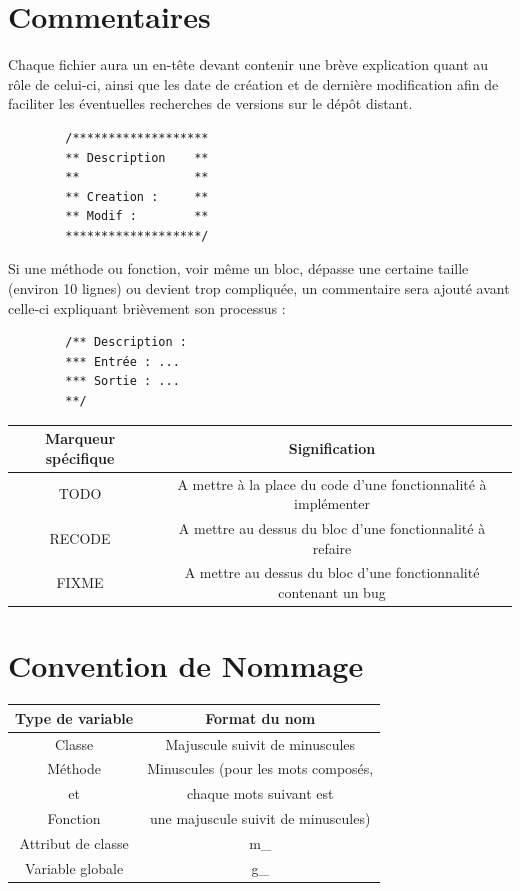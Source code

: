 \documentclass[a4paper]{article}
\newcommand{\alinea}{\hspace*{0.5cm}}
\begin{document}
    \section{Commentaires}
      \alinea Chaque fichier aura un en-tête devant contenir une brève explication quant au rôle de celui-ci, ainsi que les date de création et de dernière modification afin de faciliter les éventuelles recherches de versions sur le dépôt distant.\\
      \begin{verbatim}
        /*******************
        ** Description    **
        **                **
        ** Creation :     **
        ** Modif :        **
        *******************/
      \end{verbatim}
      \alinea Si une méthode ou fonction, voir même un bloc, dépasse une certaine taille (environ 10 lignes) ou devient trop compliquée, un commentaire sera ajouté avant celle-ci expliquant brièvement son processus :
      \begin{verbatim}
        /** Description :
        *** Entrée : ...
        *** Sortie : ...
        **/
      \end{verbatim}
      \begin{small}
        \begin{tabular}{| c | c |}
          \hline
          \textbf{Marqueur spécifique} & \textbf{Signification}\\
          \hline
          TODO & A mettre à la place du code d'une fonctionnalité à implémenter\\
          \hline
          RECODE & A mettre au dessus du bloc d'une fonctionnalité à refaire\\
          \hline
          FIXME & A mettre au dessus du bloc d'une fonctionnalité contenant un bug\\
          \hline
        \end{tabular}
      \end{small}

    \section{Convention de Nommage}
      \begin{small}
        \begin{tabular}{| c | c |}
          \hline
          \textbf{Type de variable} & \textbf{Format du nom}\\
          \hline
          Classe & Majuscule suivit de minuscules\\
          \hline
          Méthode & Minuscules (pour les mots composés,\\
          et & chaque mots suivant est\\
          Fonction & une majuscule suivit de minuscules)\\
          \hline
          Attribut de classe & m\_\\
          \hline
          Variable globale & g\_\\
          \hline
        \end{tabular}
      \end{small}
\end{document}
